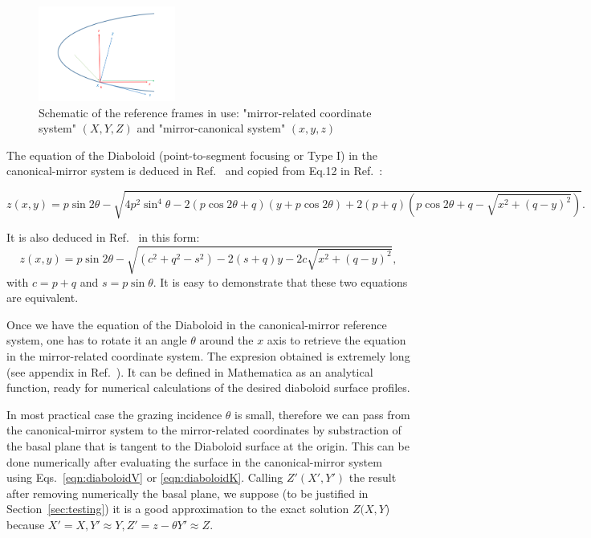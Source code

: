 \documentclass[a4paper, 11pt]{article}
\begin{document}
\begin{figure}[h]
\centering
\includegraphics[width=0.4\textwidth]{figures/diaboloid_frame.png}
\caption{\label{fig:frame}Schematic of the reference frames in use: "mirror-related coordinate system" $(X,Y,Z)$ and "mirror-canonical system" $(x,y,z)$}
\end{figure}

The equation of the Diaboloid (point-to-segment focusing or Type I) in the canonical-mirror system is deduced in Ref.~\cite{Valeriy2020a} and copied from Eq.12 in Ref.~\cite{Valeriy2020b}:

\begin{equation}
\label{eqn:diaboloidV}
z(x,y) = p \sin2\theta- \sqrt{ 4 p^2 \sin^4\theta - 2 (p \cos2\theta+q) (y + p  \cos2\theta) + 2 (p+q) (p \cos2\theta + q - \sqrt{x^2 + (q-y)^2}) }.
\end{equation}


It is also deduced in Ref.~\cite{Goldberg2020} in this form:
\begin{equation}
\label{eqn:diaboloidK}
z(x,y) = p \sin2\theta - \sqrt{(c^2 + q^2 - s^2) - 2 (s  + q) y - 2 c \sqrt{x^2 + (q-y)^2}},
\end{equation}
with $c=p+q$ and $s=p\sin\theta$. It is easy to demonstrate that these two equations are equivalent.

Once we have the equation of the Diaboloid in the canonical-mirror reference system, one has to rotate it an angle $\theta$ around the $x$ axis to retrieve the equation in the mirror-related coordinate system. The expresion obtained is extremely long (see appendix in Ref.~\cite{Valeriy2020b}). It can be defined in Mathematica as an analytical function, ready for numerical calculations of the desired diaboloid surface profiles.

In most practical case the grazing incidence $\theta$ is small, therefore we can pass from the canonical-mirror system to the mirror-related coordinates by substraction of the basal plane that is tangent to the Diaboloid surface at the origin. This can be done numerically after evaluating the surface in the canonical-mirror system using Eqs.~\ref{eqn:diaboloidV} or \ref{eqn:diaboloidK}. Calling $Z'(X',Y')$ the result after removing numerically the basal plane, we suppose (to be justified in Section~\ref{sec:testing}) it is a good approximation to the exact solution $Z(X,Y$) because $X'=X, Y'\approx Y, Z'=z - \theta Y' \approx Z$. 
\end{document}
